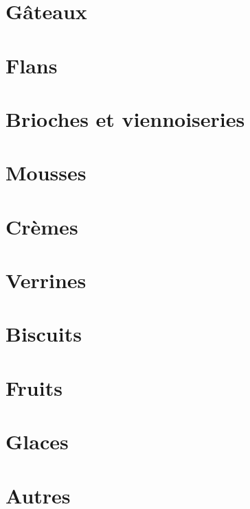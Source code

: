 \documentclass[A4paper,twoside, 12pt]{book}
\begin{document}
	\chapter{G\^ateaux}





		
	\chapter{Flans}

	\chapter{Brioches et viennoiseries}




	\chapter{Mousses}
	\chapter{Cr\`emes}


	\chapter{Verrines}
	
	\chapter{Biscuits}


	\chapter{Fruits}

	\chapter{Glaces}
	\chapter{Autres}





\end{document}

